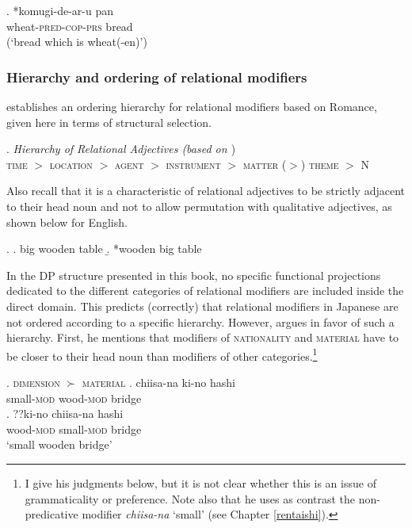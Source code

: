 \documentclass [output=book,colorlinks,citecolor=brown]{langscibook}
\begin{document}
\exg. *komugi-de-ar-u pan\\
wheat-\textsc{pred-cop-prs} bread\\
(`bread which is wheat(-en)’) \label{komugi dearu}

\subsubsection{Hierarchy and ordering of relational modifiers}

\citet{bortolotto:2016:RA} establishes an ordering hierarchy for relational modifiers based on Romance, given here in terms of structural selection. %

\ex. \emph{Hierarchy of Relational Adjectives (based on \citealt[180]{bortolotto:2016:RA}})\\
\textsc{time} $>$ \textsc{location} $>$ \textsc{agent} $>$ \textsc{instrument} $>$ \textsc{matter} ($>$) \textsc{theme} $>$ N

Also recall that it is a characteristic of relational adjectives to be strictly adjacent to their head noun and not to allow permutation with qualitative adjectives, as shown below for English.

\ex. \a. big wooden table
\b. *wooden big table \null \hfill \citep[66]{bisetto:2010:RA}

In the DP structure presented in this book, no specific functional projections dedicated to the different categories of relational modifiers are included inside the direct domain. This predicts (correctly) that relational modifiers in Japanese are not ordered according to a specific hierarchy. However, \citet{watanabe:2012:direct} argues in favor of such a hierarchy. First, he mentions that modifiers of \textsc{nationality} and \textsc{material} have to be closer to their head noun than modifiers of other categories.\footnote{I give his judgments below, but it is not clear whether this is an issue of grammaticality or preference. Note also that he uses as contrast the non-predicative modifier \textit{chiisa-na} `small' (see Chapter \ref{rentaishi}).} %


\ex. \textsc{dimension} $\succ$ \textsc{material}
\label{chiisa1} \ag. chiisa-na ki-no hashi\\
small-\textsc{mod} wood-\textsc{mod} bridge\\
\bg. ??ki-no chiisa-na hashi\\
wood-\textsc{mod} small-\textsc{mod} bridge\\
`small wooden bridge' \hfill \citep[507]{watanabe:2012:direct}
\end{document}

